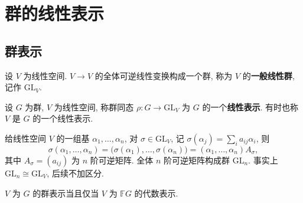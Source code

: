 \section{群的线性表示}

\subsection{群表示}

\begin{definition}[一般线性群]\label{def:glv}
设 $V$ 为线性空间. $V\to V$ 的全体可逆线性变换构成一个群, 称为 $V$ 的\textbf{一般线性群},
记作 $\mathrm{GL}_V$.
\end{definition}

\begin{definition}[群的线性表示]\label{def:group-rep}
设 $G$ 为群, $V$ 为线性空间, 称群同态 $\rho\colon G\to\mathrm{GL}_V$ 为 $G$ 的一个\textbf{线性表示}.
有时也称 $V$ 是 $G$ 的一个线性表示.
\end{definition}

\begin{remark}\label{rem:gl-matrix}
给线性空间 $V$ 的一组基 $\alpha_1,\dots,\alpha_n$, 对 $\sigma\in\mathrm{GL}_V$, 记
$\sigma(\alpha_j)=\sum_{i}a_{ij}\alpha_i$, 则
\begin{equation*}
  \sigma(\alpha_1,\dots,\alpha_n)=\bigl(\sigma(\alpha_1),\dots,\sigma(\alpha_n)\bigr)
  =(\alpha_1,\dots,\alpha_n)A_\sigma ,
\end{equation*}
其中 $A_\sigma=(a_{ij})$ 为 $n$ 阶可逆矩阵.
全体 $n$ 阶可逆矩阵构成群 $\mathrm{GL}_n$. 事实上 $\mathrm{GL}_n\cong\mathrm{GL}_V$, 后续不加区分.
\end{remark}

\begin{proposition}\label{prop:rep-alg}
$V$ 为 $G$ 的群表示当且仅当 $V$ 为 $\mathbb{F}G$ 的代数表示.
\end{proposition}

